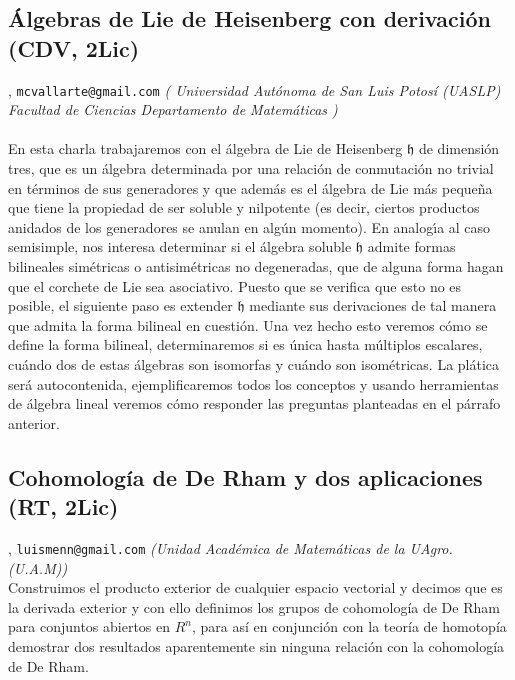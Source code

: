 \subsection{\sffamily \'Algebras de Lie de Heisenberg con derivaci\'on {\footnotesize (CDV, 2Lic)}} \label{reg-800} 
, {\tt mcvallarte@gmail.com}  {\slshape ( Universidad Aut\'onoma de San Luis Potos\'i (UASLP)  Facultad de Ciencias  Departamento de Matem\'aticas )}\\
\\
\noindent En esta charla trabajaremos con el \'algebra de Lie de Heisenberg $\mathfrak h$ de dimensi\'on tres, que es un \'algebra determinada por una relaci\'on de conmutaci\'on no trivial en t\'erminos de sus generadores y que adem\'as  es el \'algebra de Lie m\'as peque\~na que tiene la propiedad de ser soluble y nilpotente (es decir, ciertos productos anidados de los generadores se anulan en alg\'un momento). En analog\'{\i}a al caso semisimple, nos interesa determinar si el \'algebra soluble $\mathfrak h$ admite formas bilineales sim\'etricas o antisim\'etricas no degeneradas, que de alguna forma hagan que el corchete de Lie sea asociativo. Puesto que se verifica que esto no es posible, el siguiente paso es extender $\mathfrak h$ mediante sus derivaciones de tal manera que admita la forma bilineal en cuesti\'on. Una vez hecho esto veremos c\'omo se define la forma bilineal, determinaremos si es \'unica hasta m\'ultiplos escalares, cu\'ando dos de estas \'algebras son isomorfas y cu\'ando son isom\'etricas.  La pl\'atica ser\'a autocontenida, ejemplificaremos todos los conceptos y usando herramientas de \'algebra lineal veremos c\'omo responder las preguntas planteadas en el p\'arrafo anterior.
\subsection{\sffamily Cohomolog\'ia de De Rham y dos aplicaciones {\footnotesize (RT, 2Lic)}} \label{reg-948} 
, {\tt luismenn@gmail.com}  {\slshape (Unidad Acad\'emica de Matem\'aticas de la UAgro. (U.A.M))}\\
          \noindent Construimos el producto exterior de cualquier espacio vectorial y decimos que es la derivada exterior y con ello definimos los grupos de cohomolog\'ia de De Rham para conjuntos abiertos en $R^n$, para as\'i en conjunci\'on con la teor\'ia de homotop\'ia demostrar dos resultados aparentemente sin ninguna relaci\'on con la cohomolog\'ia de De Rham.
